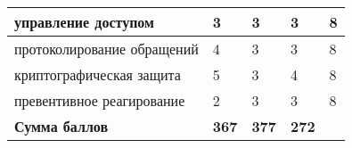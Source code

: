\begin{longtable}{|x{4cm}|x{2cm}|x{2.8cm}|x{2.8cm}|x{2cm}|}
	управление доступом                                                       & 3                                                               & 3                         & 3                         & 8 \\ \hline
	протоколирование обращений                                                & 4                                                               & 3                         & 3                         & 8 \\ \hline
	криптографическая защита                                                  & 5                                                               & 3                         & 4                         & 8 \\ \hline
	превентивное реагирование                                                 & 2                                                               & 3                         & 3                         & 8 \\ \hline
	\textbf{Сумма баллов}                                                     & \textbf{367}                                                    & \textbf{377}              & \textbf{272}              &   \\
	\hline
\end{longtable}


